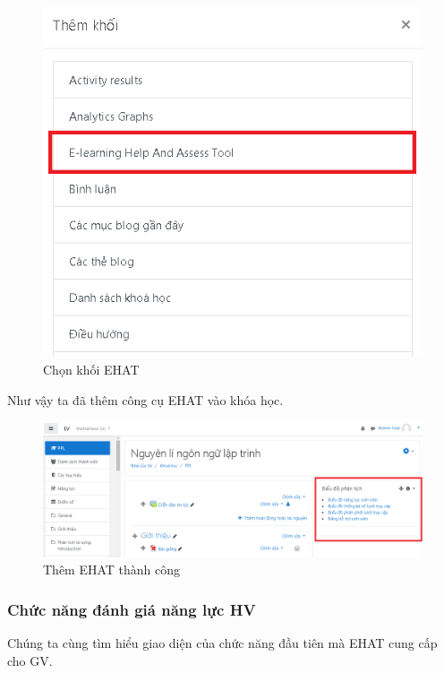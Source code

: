 \begin{center}
	\begin{figure}[htp]
		\begin{center}
			\includegraphics[width=0.6\linewidth]{img/37}
		\end{center}
		\caption{Chọn khối EHAT}
		\label{refhinh45}
	\end{figure}
\end{center}

Như vậy ta đã thêm công cụ EHAT vào khóa học.

\begin{center}
	\begin{figure}[htp]
		\begin{center}
			\includegraphics[width=1\linewidth]{img/39}
		\end{center}
		\caption{Thêm EHAT thành công}
		\label{refhinh47}
	\end{figure}
\end{center}

\newpage
\subsubsection*{Chức năng đánh giá năng lực HV}

Chúng ta cùng tìm hiểu giao diện của chức năng đầu tiên mà EHAT cung cấp cho GV.

